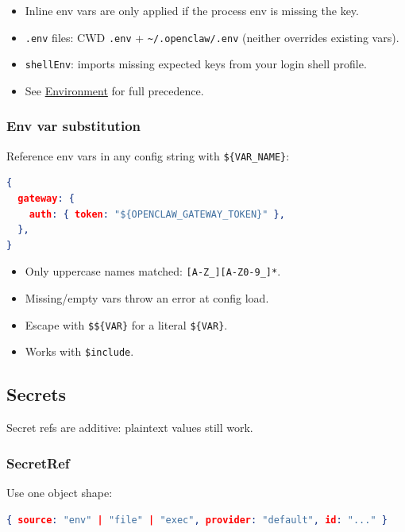 \begin{itemize}
  \item Inline env vars are only applied if the process env is missing the key.
  \item \texttt{.env} files: CWD \texttt{.env} + \texttt{\textasciitilde{}/.openclaw/.env} (neither overrides existing vars).
  \item \texttt{shellEnv}: imports missing expected keys from your login shell profile.
  \item See \href{/help/environment}{Environment} for full precedence.
\end{itemize}


\subsubsection{Env var substitution}


Reference env vars in any config string with \texttt{\$\{VAR\_NAME\}}:

\begin{lstlisting}[language=json]
{
  gateway: {
    auth: { token: "${OPENCLAW_GATEWAY_TOKEN}" },
  },
}
\end{lstlisting}


\begin{itemize}
  \item Only uppercase names matched: \texttt{[A-Z\_][A-Z0-9\_]*}.
  \item Missing/empty vars throw an error at config load.
  \item Escape with \texttt{\$\$\{VAR\}} for a literal \texttt{\$\{VAR\}}.
  \item Works with \texttt{\$include}.
\end{itemize}


\hrulefill


\subsection{Secrets}


Secret refs are additive: plaintext values still work.

\subsubsection{SecretRef}


Use one object shape:

\begin{lstlisting}[language=json]
{ source: "env" | "file" | "exec", provider: "default", id: "..." }
\end{lstlisting}


